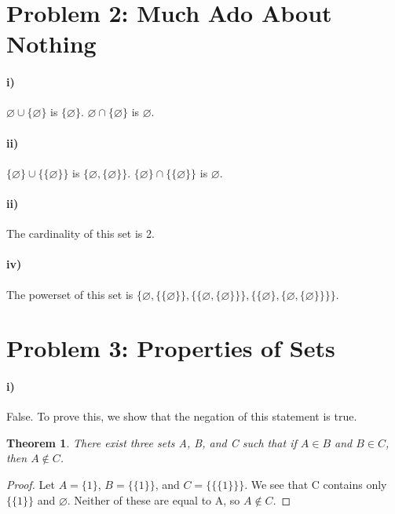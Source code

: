 \documentclass[10pt,letter]{article}
\newtheorem*{thm}{Theorem}
\begin{document}
\section*{Problem 2: Much Ado About Nothing}

\paragraph{i)} $\varnothing \cup \{\varnothing\}$ is $\{\varnothing\}.$ $\varnothing \cap \{\varnothing\}$ is $\varnothing$.

\paragraph{ii)} $\{\varnothing\} \cup \{\{\varnothing\}\}$ is $\{ \varnothing, \{\varnothing\} \}$. $\{\varnothing\} \cap \{\{\varnothing\}\}$ is $\varnothing$.

\paragraph{ii)} The cardinality of this set is 2.

\paragraph{iv)} The powerset of this set is $\{ \varnothing, \{\{\varnothing\}\}, \{\{\varnothing, \{\varnothing\}\}\}, \{\{\varnothing\}, \{\varnothing, \{\varnothing\}\}\}\}$.

\section*{Problem 3: Properties of Sets}

\paragraph{i)} False. To prove this, we show that the negation of this statement is true. \begin{thm} There exist three sets A, B, and C such that if $A \in B$ and $B \in C$, then $A \not \in C$. \end{thm} \begin{proof} Let $A = \{1\}$, $B = \{\{1\}\}$, and $C = \{ \{ \{1\}\}\}$. We see that C contains only $\{\{1\}\}$ and $\varnothing$. Neither of these are equal to A, so $A \not \in C$. \end{proof}
\end{document}
